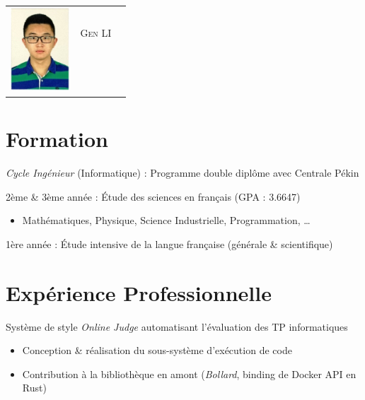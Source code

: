 \documentclass{resume}
\begin{document}

{
  \Large{
    \begin{tabu}{ c l r }
       & \scshape{Gen LI}                                      \\
       &                             \\
       &                           \\
       & 
    \end{tabu}
  }
}

\section{Formation}
\textit{Cycle Ingénieur} (Informatique) : Programme double diplôme avec Centrale Pékin

2ème \& 3ème année : Étude des sciences en français (GPA : 3.6647)
\begin{itemize}
  \item Mathématiques, Physique, Science Industrielle, Programmation, …
\end{itemize}
1ère année : Étude intensive de la langue française (générale \& scientifique)


\section{Expérience Professionnelle}
Système de style \textit{Online Judge} automatisant l'évaluation des TP informatiques
\begin{itemize}
  \item Conception \& réalisation du sous-système d'exécution de code
  \item Contribution à la bibliothèque en amont (\textit{Bollard}, binding de Docker API en Rust)
\end{itemize}
\end{document}
